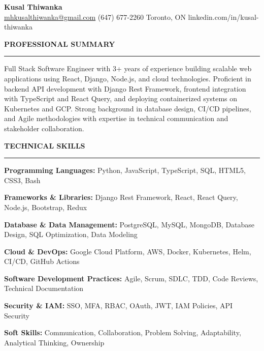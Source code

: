 \documentclass[10pt,letterpaper]{article}
\begin{document}
\begin{center}
{\LARGE\textbf{Kusal Thiwanka}}\\[3pt]
\href{mailto:mhkusalthiwanka@gmail.com}{mhkusalthiwanka@gmail.com}\hspace{2em}%
(647) 677{-}2260\hspace{2em}%
Toronto, ON\hspace{2em}
linkedin.com/in/kusal-thiwanka
\end{center}

\vspace{6pt}

\textbf{PROFESSIONAL SUMMARY}\\[-8pt]
\noindent\rule{\textwidth}{1pt}

\vspace{-2pt}

Full Stack Software Engineer with 3+ years of experience building scalable web applications using React, Django, Node.js, and cloud technologies. Proficient in backend API development with Django Rest Framework, frontend integration with TypeScript and React Query, and deploying containerized systems on Kubernetes and GCP. Strong background in database design, CI/CD pipelines, and Agile methodologies with expertise in technical communication and stakeholder collaboration.

\vspace{8pt}

\textbf{TECHNICAL SKILLS}\\[-8pt]
\noindent\rule{\textwidth}{1pt}

\vspace{-2pt}

\textbf{Programming Languages:} Python, JavaScript, TypeScript, SQL, HTML5, CSS3, Bash

\textbf{Frameworks \& Libraries:} Django Rest Framework, React, React Query, Node.js, Bootstrap, Redux

\textbf{Database \& Data Management:} PostgreSQL, MySQL, MongoDB, Database Design, SQL Optimization, Data Modeling

\textbf{Cloud \& DevOps:} Google Cloud Platform, AWS, Docker, Kubernetes, Helm, CI/CD, GitHub Actions

\textbf{Software Development Practices:} Agile, Scrum, SDLC, TDD, Code Reviews, Technical Documentation

\textbf{Security \& IAM:} SSO, MFA, RBAC, OAuth, JWT, IAM Policies, API Security

\textbf{Soft Skills:} Communication, Collaboration, Problem Solving, Adaptability, Analytical Thinking, Ownership
\end{document}
